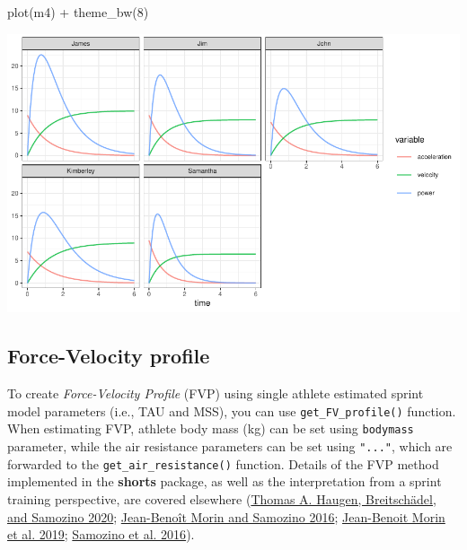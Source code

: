 \documentclass[fleqn,10pt,lineno]{wlpeerj} %
\newenvironment{Shaded}{\begin{snugshade}}{\end{snugshade}}
\newcommand{\DecValTok}[1]{\textcolor[rgb]{0.00,0.00,0.81}{#1}}
\newcommand{\FunctionTok}[1]{\textcolor[rgb]{0.00,0.00,0.00}{#1}}
\newcommand{\NormalTok}[1]{#1}
\newcommand{\SpecialCharTok}[1]{\textcolor[rgb]{0.00,0.00,0.00}{#1}}
\begin{document}
\begin{Shaded}
\begin{Highlighting}[]
\FunctionTok{plot}\NormalTok{(m4) }\SpecialCharTok{+} \FunctionTok{theme\_bw}\NormalTok{(}\DecValTok{8}\NormalTok{)}
\end{Highlighting}
\end{Shaded}

\begin{center}\includegraphics[width=1\linewidth]{paper_files/figure-latex/unnamed-chunk-20-1} \end{center}

\hypertarget{force-velocity-profile}{%
\subsection{Force-Velocity profile}\label{force-velocity-profile}}

To create \emph{Force-Velocity Profile} (FVP) using single athlete estimated sprint model parameters (i.e., TAU and MSS), you can use \texttt{get\_FV\_profile()} function. When estimating FVP, athlete body mass (kg) can be set using \texttt{bodymass} parameter, while the air resistance parameters can be set using \texttt{"..."}, which are forwarded to the \texttt{get\_air\_resistance()} function. Details of the FVP method implemented in the \textbf{shorts} package, as well as the interpretation from a sprint training perspective, are covered elsewhere (\protect\hyperlink{ref-haugenPowerForceVelocityProfilingSprinting2020}{Thomas A. Haugen, Breitschädel, and Samozino 2020}; \protect\hyperlink{ref-morinInterpretingPowerForceVelocityProfiles2016}{Jean-Benoît Morin and Samozino 2016}; \protect\hyperlink{ref-morinSimpleMethodComputing2019}{Jean-Benoit Morin et al. 2019}; \protect\hyperlink{ref-samozinoSimpleMethodMeasuring2016}{Samozino et al. 2016}).
\end{document}
